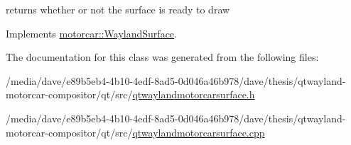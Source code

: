 returns whether or not the surface is ready to draw 



Implements \hyperlink{classmotorcar_1_1WaylandSurface_af2f54076ec690f4d478771183c9b0db5}{motorcar\-::\-Wayland\-Surface}.



The documentation for this class was generated from the following files\-:\begin{DoxyCompactItemize}
\item 
/media/dave/e89b5eb4-\/4b10-\/4edf-\/8ad5-\/0d046a46b978/dave/thesis/qtwayland-\/motorcar-\/compositor/qt/src/\hyperlink{qtwaylandmotorcarsurface_8h}{qtwaylandmotorcarsurface.\-h}\item 
/media/dave/e89b5eb4-\/4b10-\/4edf-\/8ad5-\/0d046a46b978/dave/thesis/qtwayland-\/motorcar-\/compositor/qt/src/\hyperlink{qtwaylandmotorcarsurface_8cpp}{qtwaylandmotorcarsurface.\-cpp}\end{DoxyCompactItemize}
